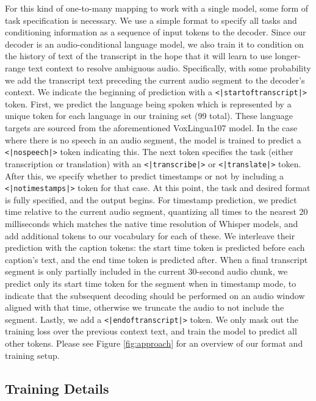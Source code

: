 For this kind of one-to-many mapping to work with a single model, some form of task specification is necessary. We use a simple format to specify all tasks and conditioning information as a sequence of input tokens to the decoder. Since our decoder is an audio-conditional language model, we also train it to condition on the history of text of the transcript in the hope that it will learn to use longer-range text context to resolve ambiguous audio. Specifically, with some probability we add the transcript text preceding the current audio segment to the decoder's context. We indicate the beginning of prediction with a \texttt{<|startoftranscript|>} token. First, we predict the language being spoken which is represented by a unique token for each language in our training set (99 total). These language targets are sourced from the aforementioned VoxLingua107 model. In the case where there is no speech in an audio segment, the model is trained to predict a \texttt{<|nospeech|>} token indicating this. The next token specifies the task (either transcription or translation) with an \texttt{<|transcribe|>} or \texttt{<|translate|>} token. After this, we specify whether to predict timestamps or not by including a \texttt{<|notimestamps|>} token for that case. At this point, the task and desired format is fully specified, and the output begins. For timestamp prediction, we predict time relative to the current audio segment, quantizing all times to the nearest 20 milliseconds which matches the native time resolution of Whisper models, and add additional tokens to our vocabulary for each of these. We interleave their prediction with the caption tokens: the start time token is predicted before each caption's text, and the end time token is predicted after. When a final transcript segment is only partially included in the current 30-second audio chunk, we predict only its start time token for the segment when in timestamp mode, to indicate that the subsequent decoding should be performed on an audio window aligned with that time, otherwise we truncate the audio to not include the segment. Lastly, we add a \texttt{<|endoftranscript|>} token. We only mask out the training loss over the previous context text, and train the model to predict all other tokens. Please see Figure \ref{fig:approach} for an overview of our format and training setup.

\subsection{Training Details}\label{subsec:training-details}

